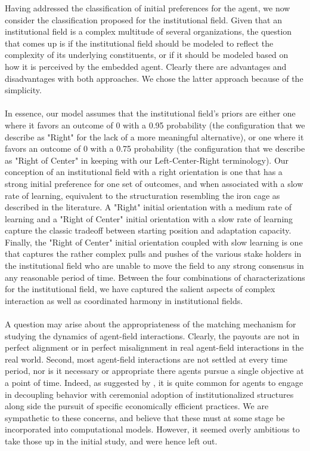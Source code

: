 \documentclass[12pt,letterpaper]{article}
\begin{document}
\noindent Having addressed the classification of initial preferences for the agent, we now consider the classification proposed for the institutional field. Given that an institutional field is a complex multitude of several organizations, the question that comes up is if the institutional field should be modeled to reflect the complexity of its underlying constituents, or if it should be modeled based on how it is perceived by the embedded agent. Clearly there are advantages and disadvantages with both approaches. We chose the latter approach because of the simplicity. \\\\
In essence, our model assumes that the institutional field's priors are either one where it favors an outcome of 0 with a 0.95 probability (the configuration that we describe as "Right" for the lack of a more meaningful alternative), or one where it favors an outcome of 0 with a 0.75 probability (the configuration that we describe as "Right of Center" in keeping with our Left-Center-Right terminology). Our conception of an institutional field with a right orientation is one that has a strong initial preference for one set of outcomes, and when associated with a slow rate of learning, equivalent to the structuration resembling the iron cage as described in the literature. A "Right" initial orientation with a medium rate of learning and a "Right of Center" initial orientation with a slow rate of learning capture the classic tradeoff between starting position and adaptation capacity. Finally, the "Right of Center" initial orientation coupled with slow learning is one that captures the rather complex pulls and pushes of the various stake holders in the institutional field who are unable to move the field to any strong consensus in any reasonable period of time. Between the four combinations of characterizations for the institutional field,  we have captured the salient aspects of complex interaction as well as coordinated harmony in institutional fields.\\\\

\noindent A question may arise about the appropriateness of the matching mechanism for studying the dynamics of agent-field interactions. Clearly, the payouts are not in perfect alignment or in perfect misalignment in real agent-field interactions in the real world. Second, most agent-field interactions are not settled at every time period, nor is it necessary or appropriate there agents pursue a single objective at a point of time. Indeed, as suggested by \cite{Kostova2008}, it is quite common for agents to engage in decoupling behavior with ceremonial adoption of institutionalized structures along side the pursuit of specific economically efficient practices. We are sympathetic to these concerns, and believe that these must at some stage be incorporated into computational models. However, it seemed overly ambitious to take those up in the initial study, and were hence left out.\\\\
\end{document}
